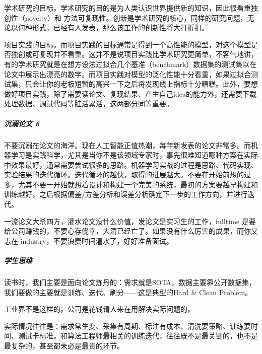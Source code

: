 \documentclass[letterpaper,11pt,english]{sphinxmanual}
\begin{document}
学术研究的目标。学术研究的目的是为人类认识世界提供新的知识，因此很看重独创性（novelty）和
方法可复现性。创新是学术研究的核心，同样的研究问题，无论以何种形式，已经有人发表，那么该工作的创新性将大打折扣。

项目实践的目标。而项目实践的目标通常是得到一个高性能的模型，对这个模型是否独创或可复现并不看重。这并不是说项目实践比学术研究更简单，不客气地讲，有的学术研究就是在想方设法过拟合几个基准（benchmark）数据集的测试集以在论文中展示出漂亮的数字。而项目实践对模型的泛化性能十分看重，如果过拟合测试集，只会让你的老板短暂的高兴一下之后将发现线上指标十分糟糕。此外，要想做好项目实践，除了需要读论文、复现结果、产生自己idea的能力外，还需要下载处理数据、调试代码等脏活累活，这两部分同等重要。


\subparagraph{沉溺论文 6\sphinxfootnotemark[254]}
\label{\detokenize{chapter_introduction/AI_PM:id29}}%
\begin{footnotetext}[254]\sphinxAtStartFootnote
{}
%
\end{footnotetext}\ignorespaces 
不要沉溺在论文的海洋。现在人工智能正值热潮，每年新发表的论文非常多。而机器学习是实践科学，尤其是当你不是该领域专家时，事先很难知道哪种方案在实际中效果最好，通常需要尝试很多的思路。机器学习实战的过程是思路、代码实现、实验结果的迭代循环。迭代循环的越快，取得的进展越大。不要在开始前想的过多，尤其不要一开始就想着设计和构建一个完美的系统，最初的方案要越早构建和训练越好，之后根据偏差/方差分析和误差分析确定下一步的工作方向，并进行迭代。

一流论文大杀四方，灌水论文没什么价值，发论文是实习生的工作，full\sphinxhyphen{}time
是要给公司赚钱的，不要心存侥幸，大清已经亡了。如果没有什么厉害的成果，而你又志在
industry，不要浪费时间灌水了，好好准备面试。
%
\begin{footnote}[255]\sphinxAtStartFootnote
{}
%
\end{footnote}


\subparagraph{学生思维}
\label{\detokenize{chapter_introduction/AI_PM:id30}}
读书时，我们主要是面向论文炼丹的：需求就是SOTA，数据主要靠公开数据集，我们要做的主要就是训练、迭代、刷分——这是典型的Hard
\& Clean Problem。

工业界不是这样的。公司是花钱请人来在用解决实际问题的。

实际情况往往是：需求常生变、采集有周期、标注有成本、清洗要策略、训练要时间、测试卡标准。和算法工程师最相关的训练迭代，往往既不是最关键的，也不是最复杂的，甚至都未必是最贵的环节。
\end{document}
